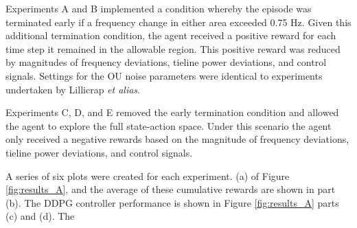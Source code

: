Experiments A and B implemented a condition whereby the episode was terminated early if a frequency change in either area exceeded 0.75 Hz. Given this additional termination condition, the agent received a positive reward for each time step it remained in the allowable region. This positive reward was reduced by magnitudes of frequency deviations, tieline power deviations, and control signals. Settings for the OU noise parameters were identical to experiments undertaken by Lillicrap \textit{et alias}.

Experiments C, D, and E removed the early termination condition and allowed the agent to explore the full state-action space. Under this scenario the agent only received a negative rewards based on the magnitude of frequency deviations, tieline power deviations, and control signals. 

A series of six plots were created for each experiment. (a) of Figure \ref{fig:results_A}, and the average of these cumulative rewards are shown in part (b). The DDPG controller performance is shown in Figure \ref{fig:results_A} parts (c) and (d). The 





















\clearpage


















